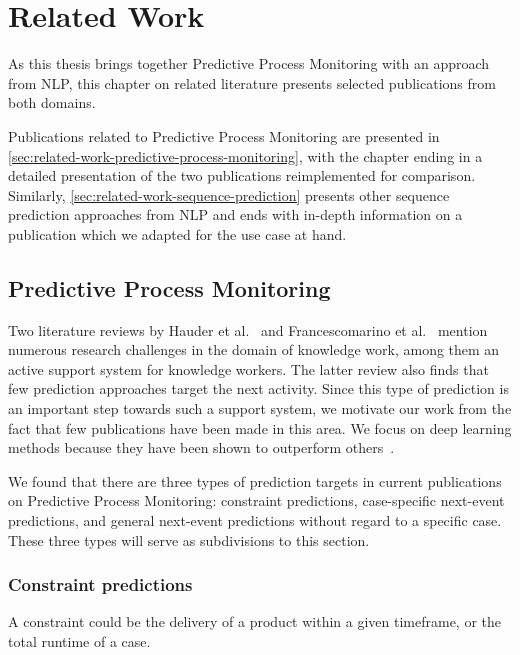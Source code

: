\chapter{Related Work}\label{chap:related-work}
As this thesis brings together Predictive Process Monitoring with an approach from NLP, this chapter on related literature presents selected publications from both domains.

Publications related to Predictive Process Monitoring are presented in \autoref{sec:related-work-predictive-process-monitoring}, with the chapter ending in a detailed presentation of the two publications reimplemented for comparison. Similarly, \autoref{sec:related-work-sequence-prediction} presents other sequence prediction approaches from NLP and ends with in-depth information on a publication which we adapted for the use case at hand.

\section{Predictive Process Monitoring}
\label{sec:related-work-predictive-process-monitoring}
Two literature reviews by Hauder et al.~\cite{hauder2014} and Francescomarino et al.~\cite{francescomarino2018} mention numerous research challenges in the domain of knowledge work, among them an active support system for knowledge workers. The latter review also finds that few prediction approaches target the next activity. Since this type of prediction is an important step towards such a support system, we motivate our work from the fact that few publications have been made in this area. We focus on deep learning methods because they have been shown to outperform others~\cite{tax2018interdisciplinary}.

We found that there are three types of prediction targets in current publications on Predictive Process Monitoring: constraint predictions, case-specific next-event predictions, and general next-event predictions without regard to a specific case. These three types will serve as subdivisions to this section.

\subsection*{Constraint predictions}
A constraint could be the delivery of a product within a given timeframe, or the total runtime of a case.

